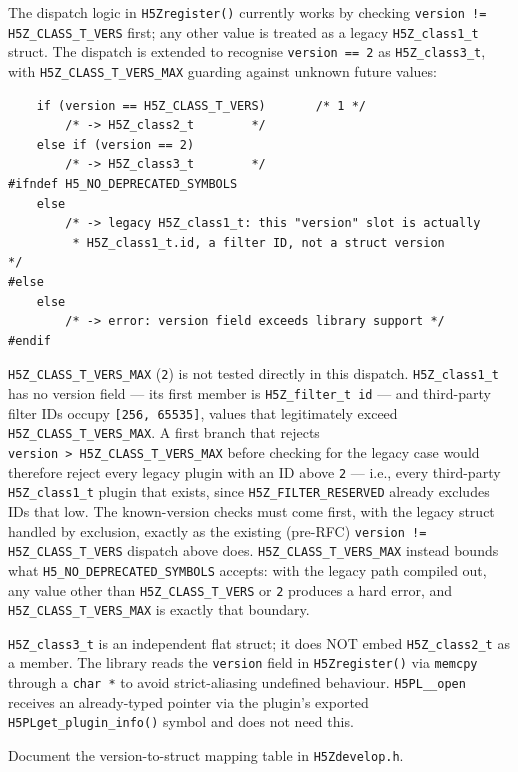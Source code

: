 \documentclass[../RFC-HDFG-2026-001.tex]{subfiles}
\begin{document}
The dispatch logic in \texttt{H5Zregister()} currently works by checking
\texttt{version != H5Z\_CLASS\_T\_VERS} first; any other value is treated as a
legacy \texttt{H5Z\_class1\_t} struct.  The dispatch is extended to recognise
\texttt{version == 2} as \texttt{H5Z\_class3\_t}, with
\texttt{H5Z\_CLASS\_T\_VERS\_MAX} guarding against unknown future values:

\begin{verbatim}
    if (version == H5Z_CLASS_T_VERS)       /* 1 */
        /* -> H5Z_class2_t        */
    else if (version == 2)
        /* -> H5Z_class3_t        */
#ifndef H5_NO_DEPRECATED_SYMBOLS
    else
        /* -> legacy H5Z_class1_t: this "version" slot is actually
         * H5Z_class1_t.id, a filter ID, not a struct version        */
#else
    else
        /* -> error: version field exceeds library support */
#endif
\end{verbatim}

\texttt{H5Z\_CLASS\_T\_VERS\_MAX} (\texttt{2}) is not tested directly in
this dispatch.  \texttt{H5Z\_class1\_t} has no version field --- its first
member is \texttt{H5Z\_filter\_t id} --- and third-party filter IDs
occupy \texttt{[256, 65535]}, values that legitimately exceed
\texttt{H5Z\_CLASS\_T\_VERS\_MAX}.  A first branch that rejects
\texttt{version~>~H5Z\_CLASS\_T\_VERS\_MAX} before checking for the
legacy case would therefore reject every legacy plugin with an ID above
\texttt{2} --- i.e., every third-party \texttt{H5Z\_class1\_t} plugin
that exists, since \texttt{H5Z\_FILTER\_RESERVED} already excludes IDs
that low.  The known-version checks must come first, with the legacy
struct handled by exclusion, exactly as the existing (pre-RFC)
\texttt{version != H5Z\_CLASS\_T\_VERS} dispatch above does.
\texttt{H5Z\_CLASS\_T\_VERS\_MAX} instead bounds what
\texttt{H5\_NO\_DEPRECATED\_SYMBOLS} accepts: with the legacy path
compiled out, any value other than \texttt{H5Z\_CLASS\_T\_VERS} or
\texttt{2} produces a hard error, and \texttt{H5Z\_CLASS\_T\_VERS\_MAX}
is exactly that boundary.

\texttt{H5Z\_class3\_t} is an independent flat struct; it does NOT embed
\texttt{H5Z\_class2\_t} as a member.  The library reads the \texttt{version}
field in \texttt{H5Zregister()} via \texttt{memcpy}
through a \texttt{char~*} to avoid strict-aliasing undefined behaviour.
\texttt{H5PL\_\_open} receives an already-typed pointer via the plugin's
exported \texttt{H5PLget\_plugin\_info()} symbol and does not need this.

Document the version-to-struct mapping table in \texttt{H5Zdevelop.h}.
\end{document}
